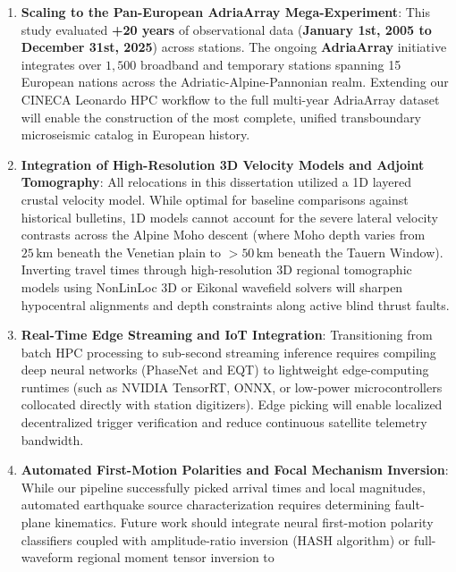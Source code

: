 \begin{enumerate}
  \item \textbf{Scaling to the Pan-European AdriaArray Mega-Experiment}:
    This study evaluated \textbf{+20 years} of observational data
    (\textbf{January 1st, 2005 to December 31st, 2025}) across
     stations.
    The ongoing \textbf{AdriaArray} initiative integrates over $1{,}500$
    broadband and temporary stations spanning 15 European nations
    across the Adriatic-Alpine-Pannonian realm. Extending our \ac{CINECA}
    Leonardo \ac{HPC} workflow to the full multi-year AdriaArray dataset
    will enable the construction of the most complete, unified
    transboundary microseismic catalog in European history.
  \item \textbf{Integration of High-Resolution 3D Velocity Models
    and Adjoint Tomography}:
    All relocations in this dissertation utilized a 1D layered
    crustal velocity model. While optimal for baseline comparisons
    against historical bulletins, 1D models cannot account for the
    severe lateral velocity contrasts across the Alpine Moho descent
    (where Moho depth varies from $25\,\unit{\kilo\meter}$ beneath
      the Venetian plain to $> 50\,\unit{\kilo\meter}$ beneath the
    Tauern Window). Inverting travel times through high-resolution
    3D regional tomographic models using NonLinLoc 3D or Eikonal
    wavefield solvers will sharpen hypocentral alignments and depth
    constraints along active blind thrust faults.
  \item \textbf{Real-Time Edge Streaming and IoT Integration}:
    Transitioning from batch \ac{HPC} processing to sub-second streaming
    inference requires compiling deep neural networks (PhaseNet and
    \ac{EQT}) to lightweight edge-computing runtimes (such as
      NVIDIA TensorRT, ONNX, or low-power microcontrollers collocated
    directly with station digitizers). Edge picking will enable
    localized decentralized trigger verification and reduce
    continuous satellite telemetry bandwidth.
  \item \textbf{Automated First-Motion Polarities and Focal
    Mechanism Inversion}:
    While our pipeline successfully picked arrival times and local magnitudes,
    automated earthquake source characterization requires determining
    fault-plane kinematics. Future work should integrate neural first-motion
    polarity classifiers  coupled with amplitude-ratio inversion (HASH
    algorithm) or full-waveform regional moment tensor inversion to

\end{enumerate}
